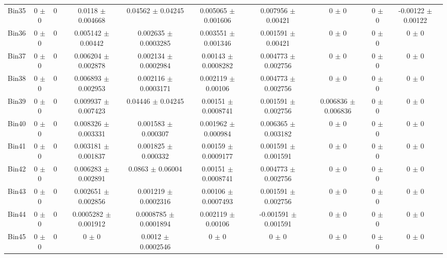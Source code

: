 \begin{tabular}{@{\extracolsep{4pt}}lccccccccc@{}}
     Bin35 & 0 $\pm$ 0 & 0 & 0.0118 $\pm$ 0.004668 & 0.04562 $\pm$ 0.04245 & 0.005065 $\pm$ 0.001606 & 0.007956 $\pm$ 0.00421 & 0 $\pm$ 0 & 0 $\pm$ 0 & -0.00122 $\pm$ 0.00122 \\ 
     Bin36 & 0 $\pm$ 0 & 0 & 0.005142 $\pm$ 0.00442 & 0.002635 $\pm$ 0.0003285 & 0.003551 $\pm$ 0.001346 & 0.001591 $\pm$ 0.00421 & 0 $\pm$ 0 & 0 $\pm$ 0 & 0 $\pm$ 0 \\ 
     Bin37 & 0 $\pm$ 0 & 0 & 0.006204 $\pm$ 0.002878 & 0.002134 $\pm$ 0.0002984 & 0.00143 $\pm$ 0.0008282 & 0.004773 $\pm$ 0.002756 & 0 $\pm$ 0 & 0 $\pm$ 0 & 0 $\pm$ 0 \\ 
     Bin38 & 0 $\pm$ 0 & 0 & 0.006893 $\pm$ 0.002953 & 0.002116 $\pm$ 0.0003171 & 0.002119 $\pm$ 0.00106 & 0.004773 $\pm$ 0.002756 & 0 $\pm$ 0 & 0 $\pm$ 0 & 0 $\pm$ 0 \\ 
     Bin39 & 0 $\pm$ 0 & 0 & 0.009937 $\pm$ 0.007423 & 0.04446 $\pm$ 0.04245 & 0.00151 $\pm$ 0.0008741 & 0.001591 $\pm$ 0.002756 & 0.006836 $\pm$ 0.006836 & 0 $\pm$ 0 & 0 $\pm$ 0 \\ 
     Bin40 & 0 $\pm$ 0 & 0 & 0.008326 $\pm$ 0.003331 & 0.001583 $\pm$ 0.000307 & 0.001962 $\pm$ 0.000984 & 0.006365 $\pm$ 0.003182 & 0 $\pm$ 0 & 0 $\pm$ 0 & 0 $\pm$ 0 \\ 
     Bin41 & 0 $\pm$ 0 & 0 & 0.003181 $\pm$ 0.001837 & 0.001825 $\pm$ 0.000332 & 0.00159 $\pm$ 0.0009177 & 0.001591 $\pm$ 0.001591 & 0 $\pm$ 0 & 0 $\pm$ 0 & 0 $\pm$ 0 \\ 
     Bin42 & 0 $\pm$ 0 & 0 & 0.006283 $\pm$ 0.002891 & 0.0863 $\pm$ 0.06004 & 0.00151 $\pm$ 0.0008741 & 0.004773 $\pm$ 0.002756 & 0 $\pm$ 0 & 0 $\pm$ 0 & 0 $\pm$ 0 \\ 
     Bin43 & 0 $\pm$ 0 & 0 & 0.002651 $\pm$ 0.002856 & 0.001219 $\pm$ 0.0002316 & 0.00106 $\pm$ 0.0007493 & 0.001591 $\pm$ 0.002756 & 0 $\pm$ 0 & 0 $\pm$ 0 & 0 $\pm$ 0 \\ 
     Bin44 & 0 $\pm$ 0 & 0 & 0.0005282 $\pm$ 0.001912 & 0.0008785 $\pm$ 0.0001894 & 0.002119 $\pm$ 0.00106 & -0.001591 $\pm$ 0.001591 & 0 $\pm$ 0 & 0 $\pm$ 0 & 0 $\pm$ 0 \\ 
     Bin45 & 0 $\pm$ 0 & 0 & 0 $\pm$ 0 & 0.0012 $\pm$ 0.0002546 & 0 $\pm$ 0 & 0 $\pm$ 0 & 0 $\pm$ 0 & 0 $\pm$ 0 & 0 $\pm$ 0 \\ 
\hline\hline
  \end{tabular}
